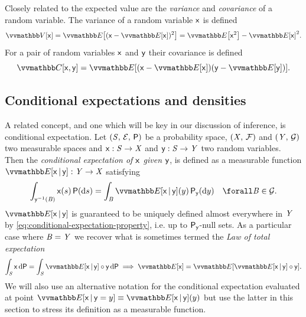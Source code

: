 Closely related to the expected value are the \emph{variance} and \emph{covariance} of a random variable. The variance of a random variable $\mathsf{x}$ is defined
\begin{equation}\label{eq:variance-definition}
  \var{\rvar{x}} = \expc{(\rvar{x} - \expc{\rvar{x}})^2} = \expc{\rvar{x}^2} - \expc{\rvar{x}}^2.
\end{equation}
For a pair of random variables $\mathsf{x}$ and $\mathsf{y}$ their covariance is defined 
\begin{equation}\label{eq:covvariance-definition}
  \cov{\rvar{x}, \rvar{y}} = \expc{(\rvar{x} - \expc{\rvar{x}})(\rvar{y} - \expc{\rvar{y}})}.
\end{equation}

\subsection{Conditional expectations and densities}

A related concept, and one which will be key in our discussion of inference, is conditional expectation. Let $(\mathit{S},\,\mathcal{E},\,\mathsf{P})$ be a probability space, $(\mathit{X},\,\mathcal{F})$ and $(\mathit{Y},\,\mathcal{G})$ two measurable spaces and $\mathsf{x} : \mathit{S} \to \mathit{X}$ and $\mathsf{y} : \mathit{S} \to \mathit{Y}$ two random variables. Then the \emph{conditional expectation of $\mathsf{x}$ given $\mathsf{y}$}, is defined as a measurable function $\expc{\rvar{x}\gvn\rvar{y}} : \set{Y} \to \set{X}$ satisfying
\begin{equation}\label{eq:conditional-expectation-property}
  \int_{\rvar{y}^{-1}(\set{B})} \rvar{x}(s) \,\probability(\dr s) =
  \int_{\set{B}} \expc{\rvar{x}\gvn\rvar{y}}(y) \,\prob{\rvar{y}}(\dr y)
  \quad \forall \set{B} \in \sset{G}.
\end{equation}
$\expc{\rvar{x}\gvn\rvar{y}}$ is guaranteed to be uniquely defined almost everywhere in $\mathit{Y}$ by \eqref{eq:conditional-expectation-property}, i.e. up to $\mathsf{P}_{\mathsf{y}}$-null sets. As a particular case where $\mathit{B} = \mathit{Y}$ we recover what is sometimes termed the \emph{Law of total expectation}
\begin{equation}\label{eq:law-of-total-expectation}
  \int_{\set{S}} \rvar{x} \,\dr\probability =
  \int_{\set{S}} \expc{\rvar{x}\gvn\rvar{y}} \circ \rvar{y} \,\dr\probability
   \implies
  \expc{\rvar{x}} =
  \expc{\expc{\rvar{x}\gvn\rvar{y}}\circ\rvar{y}}.
\end{equation}
We will also use an alternative notation for the conditional expectation evaluated at point $\expc{\rvar{x}\gvn\rvar{y} = y} \equiv \expc{\rvar{x}\gvn\rvar{y}}(y)$ but use the latter in this section to stress its definition as a measurable function.

